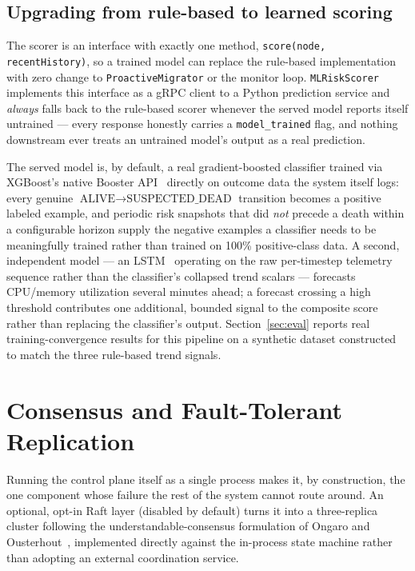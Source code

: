 \documentclass[conference]{IEEEtran}
\begin{document}
\subsection{Upgrading from rule-based to learned scoring}
\label{sec:ml-upgrade}

The scorer is an interface with exactly one method, \texttt{score(node, recentHistory)}, so a trained
model can replace the rule-based implementation with zero change to \texttt{ProactiveMigrator} or the
monitor loop. \texttt{MLRiskScorer} implements this interface as a gRPC client to a Python prediction
service and \emph{always} falls back to the rule-based scorer whenever the served model reports
itself untrained — every response honestly carries a \texttt{model\_trained} flag, and nothing
downstream ever treats an untrained model's output as a real prediction.

The served model is, by default, a real gradient-boosted classifier trained via XGBoost's native
Booster API~\cite{chen2016xgboost} directly on outcome data the system itself logs: every genuine
$\text{ALIVE}\to\text{SUSPECTED\_DEAD}$ transition becomes a positive labeled example, and periodic
risk snapshots that did \emph{not} precede a death within a configurable horizon supply the negative
examples a classifier needs to be meaningfully trained rather than trained on 100\% positive-class
data. A second, independent model — an LSTM~\cite{hochreiter1997lstm} operating on the raw
per-timestep telemetry sequence rather than the classifier's collapsed trend scalars — forecasts
CPU/memory utilization several minutes ahead; a forecast crossing a high threshold contributes one
additional, bounded signal to the composite score rather than replacing the classifier's output.
Section~\ref{sec:eval} reports real training-convergence results for this pipeline on a synthetic
dataset constructed to match the three rule-based trend signals.

\section{Consensus and Fault-Tolerant Replication}
\label{sec:raft}

Running the control plane itself as a single process makes it, by construction, the one component
whose failure the rest of the system cannot route around. An optional, opt-in Raft layer
(disabled by default) turns it into a three-replica cluster following the understandable-consensus
formulation of Ongaro and Ousterhout~\cite{ongaro2014raft}, implemented directly against the
in-process state machine rather than adopting an external coordination service.
\end{document}
